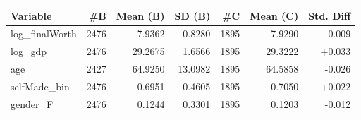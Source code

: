 \begin{tabular}{lrrrrrr}
\toprule
Variable & \#B & Mean (B) & SD (B) & \#C & Mean (C) & Std. Diff \\
\midrule
log\_finalWorth & 2476 & 7.9362 & 0.8280 & 1895 & 7.9290 & -0.009 \\
log\_gdp & 2476 & 29.2675 & 1.6566 & 1895 & 29.3222 & +0.033 \\
age & 2427 & 64.9250 & 13.0982 & 1895 & 64.5858 & -0.026 \\
selfMade\_bin & 2476 & 0.6951 & 0.4605 & 1895 & 0.7050 & +0.022 \\
gender\_F & 2476 & 0.1244 & 0.3301 & 1895 & 0.1203 & -0.012 \\
\bottomrule
\end{tabular}
